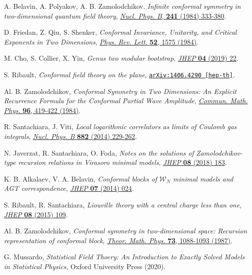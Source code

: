 \documentclass[a4paper,11pt]{article}
\begin{document}
\begin{thebibliography}{99}
 A. Belavin, A. Polyakov, A. B. Zamolodchikov. \emph{Infinite conformal symmetry in two-dimensional quantum field theory},
\href{https://doi.org/10.1016/0550-3213(84)90052-X}{\emph{Nucl. Phys. B}, {\bf 241} (1984) 333-380}.

 D. Friedan, Z. Qiu, S. Shenker, \emph{Conformal Invariance, Unitarity, and Critical Exponents in Two Dimensions}, \href{https://doi.org/10.1103/PhysRevLett.52.1575}{\emph{Phys. Rev. Lett}. {\bf 52}, 1575 (1984)}.

 M. Cho, S. Collier, X. Yin, \emph{Genus two modular bootstrap}, \href{https://doi.org/10.1007/JHEP04(2019)022}{\emph{JHEP} {\bf 04} (2019) 22}.

 S. Ribault, \emph{Conformal field theory on the plane}, \href{https://arxiv.org/abs/1406.4290}{\texttt{arXiv:1406.4290 [hep-th]}}.

 Al.  B.  Zamolodchikov, \emph{Conformal  Symmetry  in  Two  Dimensions: An  Explicit  Recurrence Formula for the  Conformal Partial  Wave  Amplitude}, \href{https://doi.org/10.1007/BF01214585}{\emph{Commun. Math. Phys.} {\bf 96},  419-422  (1984)}.

 R. Santachiara, J. Viti, \emph{Local logarithmic correlators as limits of Coulomb gas integrals},
\href{https://doi.org/10.1016/j.nuclphysb.2014.02.022}{\emph{Nucl. Phys. B} {\bf 882} (2014) 229-262}.

 N. Javerzat, R. Santachiara, O. Foda, \emph{Notes on the solutions of Zamolodchikov-type recursion relations in Virasoro minimal models}, \href{https://doi.org/10.1007/JHEP08(2018)183}{\emph{JHEP} {\bf 08} (2018) 183}.

 K. B. Alkalaev, V. A. Belavin, \emph{Conformal blocks of $\mathcal{W}_N$
minimal models and AGT correspondence}, \href{https://doi.org/10.1007/JHEP07(2014)024}{\emph{JHEP} {\bf 07} (2014) 024}.

 S. Ribault, R. Santachiara, \textit{Liouville theory with a central charge less than one}, 
\href{https://doi.org/10.1007/JHEP08(2015)109}{\emph{JHEP} {\bf 08} (2015) 109}.

 Al. B. Zamolodchikov, \emph{Conformal symmetry in two-dimensional space: Recursion representation of conformal
block}, \href{https://doi.org/10.1007/BF01022967}{\emph{Theor. Math. Phys.} {\bf 73}, 1088-1093  (1987)}.

 G. Mussardo, \emph{Statistical Field Thoery: An Introduction to Exactly Solved Models in Statistical Physics}, Oxford University Press (2020).


\end{thebibliography}
\end{document}
